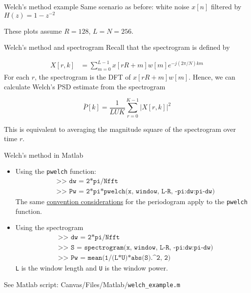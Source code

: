 \documentclass[10pt]{beamer}
\begin{document}
%
\begin{frame}{Welch's method example}
Same scenario as before: white noise $x[n]$ filtered by $H(z) = 1 - z^{-2}$

These plots assume $R = 128$, $L = N = 256$.
\begin{center}
	\resizebox{0.9\textwidth}{!}{}
\end{center}
\end{frame}

%
\begin{frame}{Welch's method and spectrogram}
Recall that the spectrogram is defined by

\begin{align*}
	X[r, k] &= \sum_{m = 0}^{L-1}x[rR+m]w[m]e^{-j(2\pi/N)km} \tag{spectrogram}
\end{align*}
For each $r$, the spectrogram is the DFT of $x[rR+m]w[m]$. Hence, we can calculate Welch's PSD estimate from the spectrogram

\begin{equation*}
	\bar{P}[k] = \frac{1}{LUK} \sum_{r = 0}^{K-1} |X[r, k]|^2 \tag{Welch's PSD estimate}
\end{equation*}

This is equivalent to averaging the magnitude square of the spectrogram over time $r$.

\end{frame}

%
\begin{frame}{Welch's method in Matlab}
\begin{itemize}
	\item Using the \texttt{pwelch} function:
	\begin{align*}
	& \texttt{>> dw = 2*pi/Nfft} \\
	& \texttt{>> Pw = 2*pi*pwelch(x, window, L-R, -pi:dw:pi-dw)} \tag{two-sided PSD estimate}
	\end{align*}
	The same \underline{convention considerations} for the periodogram apply to the \texttt{pwelch} function.
	
	\item Using the spectrogram
	\begin{align*}
		& \texttt{>> dw = 2*pi/Nfft} \\
		& \texttt{>> S = spectrogram(x, window, L-R, -pi:dw:pi-dw)}\\
		& \texttt{>> Pw = mean(1/(L*U)*abs(S).\textasciicircum 2, 2)} \tag{two-sided PSD estimate}
	\end{align*}
	\texttt{L} is the window length and \texttt{U} is the window power.
\end{itemize}

\vspace{0.25cm}
See Matlab script: Canvas/Files/Matlab/\texttt{welch\_example.m}
\end{frame}
\end{document}
